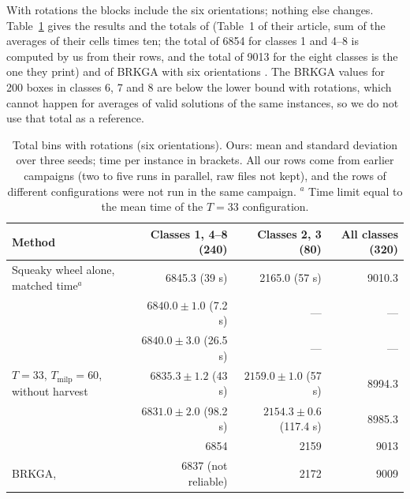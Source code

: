 With rotations the blocks include the six orientations; nothing else changes. Table~\ref{tab:e-rot} gives the results and the totals of
\citet{Mahvash2018} (Table~1 of their article, sum of the averages of their cells times ten; the total of 6854 for classes 1 and 4--8 is computed by us from their rows, and the
total of 9013 for the eight classes is the one they print) and of BRKGA with six orientations \citep{Goncalves2013}. The BRKGA values for 200 boxes in classes 6, 7 and 8 are below the lower bound with
rotations, which cannot happen for averages of valid solutions of the same instances, so we do not use that total as a reference.

\begin{table}[t]
\centering
\small\setlength{\tabcolsep}{4pt}
\caption{Total bins with rotations (six orientations). Ours: mean and standard deviation over three seeds; time per instance in brackets. All our rows come from earlier campaigns (two to five runs in parallel, raw files not kept), and the rows of different configurations were not run in the same campaign. $^{a}$ Time limit equal to the mean time of the $T=33$ configuration.}
\label{tab:e-rot}
\begin{tabular}{@{}lrrr@{}}
\toprule
Method & Classes 1, 4--8 (240) & Classes 2, 3 (80) & All classes (320)\\
\midrule
Squeaky wheel alone, matched time$^{a}$ & 6845.3 (39 s) & 2165.0 (57 s) & 9010.3\\
\cfgfast{} & $6840.0\pm 1.0$ (7.2 s) & --- & ---\\
\cfgbal{} & $6840.0\pm 3.0$ (26.5 s) & --- & ---\\
$T=33$, $T_{\mathrm{milp}}=60$, without harvest & $6835.3\pm 1.2$ (43 s) & $2159.0\pm 1.0$ (57 s) & 8994.3\\
\cfgqual{} & $6831.0\pm 2.0$ (98.2 s) & $2154.3\pm 0.6$ (117.4 s) & 8985.3\\
\midrule
\citet{Mahvash2018} & 6854 & 2159 & 9013\\
BRKGA, \citet{Goncalves2013} & 6837 (not reliable) & 2172 & 9009\\
\bottomrule
\end{tabular}
\end{table}

